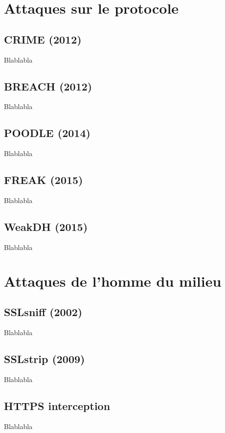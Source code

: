 \section{Attaques sur le protocole}

\subsection{CRIME (2012)}

Blablabla \cite{crime}

\subsection{BREACH (2012)}

Blablabla \cite{breach}

\subsection{POODLE (2014)}

Blablabla \cite{poodle}

\subsection{FREAK (2015)}

Blablabla \cite{freak}

\subsection{WeakDH (2015)}

Blablabla \cite{weakdh}

\section{Attaques de l'homme du milieu}

\subsection{SSLsniff (2002)}

Blablabla \cite{sslsniff-website}

\subsection{SSLstrip (2009)}

Blablabla \cite{sslstrip-website}

\subsection{HTTPS interception}

Blablabla \cite{https-interception}
